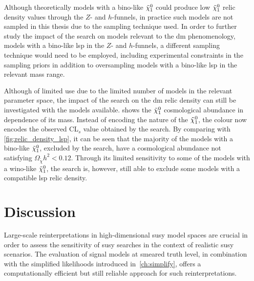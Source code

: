 Although theoretically models with a bino-like $\tilde{\chi}_1^0$ could produce low $\tilde{\chi}_1^0$ relic density values through the $Z$- and $h$-funnels, in practice such models are not sampled in this thesis due to the sampling technique used.
In order to further study the impact of the \onelepton search on models relevant to the \gls{dm} phenomenology, \ie models with a bino-like \gls{lsp} in the $Z$- and $h$-funnels, a different sampling technique would need to be employed, including experimental constraints in the sampling priors in addition to oversampling models with a bino-like \gls{lsp} in the relevant mass range.

Although of limited use due to the limited number of models in the relevant parameter space, the impact of the \onelepton search on the \gls{dm} relic density can still be investigated with the models available.  shows the $\tilde{\chi}_1^0$ cosmological abundance in dependence of its mass. Instead of encoding the nature of the $\tilde{\chi}_1^0$, the colour now encodes the observed CL$_s$ value obtained by the \onelepton search. By comparing with \cref{fig:relic_density_lsp}, it can be seen that the majority of the models with a bino-like $\tilde{\chi}_1^0$, excluded by the \onelepton search, have a cosmological abundance not satisfying $\Omega_{\tilde{\chi}} h^2 < 0.12$. Through its limited sensitivity to some of the models with a wino-like $\tilde{\chi}_1^0$, the \onelepton search is, however, still able to exclude some models with a compatible \gls{lsp} relic density. 

\section{Discussion}

Large-scale reinterpretations in high-dimensional \gls{susy} model spaces are crucial in order to assess the sensitivity of \gls{susy} searches in the context of realistic \gls{susy} scenarios. The evaluation of signal models at smeared truth level, in combination with the simplified likelihoods introduced in~\cref{ch:simplify}, offers a computationally efficient but still reliable approach for such reinterpretations.

